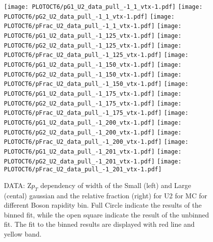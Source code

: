 \documentclass[41pt,a4paper,oneside]{report}
\begin{document}
\begin{figure}[h!]
  \begin{center}
    \texttt{[image: PLOTOCT6/pG1\_U2\_data\_pull\_-1\_1\_vtx-1.pdf]}
    \texttt{[image: PLOTOCT6/pG2\_U2\_data\_pull\_-1\_1\_vtx-1.pdf]}
    \texttt{[image: PLOTOCT6/pFrac\_U2\_data\_pull\_-1\_1\_vtx-1.pdf]} 
    \texttt{[image: PLOTOCT6/pG1\_U2\_data\_pull\_-1\_125\_vtx-1.pdf]}
    \texttt{[image: PLOTOCT6/pG2\_U2\_data\_pull\_-1\_125\_vtx-1.pdf]}
    \texttt{[image: PLOTOCT6/pFrac\_U2\_data\_pull\_-1\_125\_vtx-1.pdf]} 
    \texttt{[image: PLOTOCT6/pG1\_U2\_data\_pull\_-1\_150\_vtx-1.pdf]}
    \texttt{[image: PLOTOCT6/pG2\_U2\_data\_pull\_-1\_150\_vtx-1.pdf]}
    \texttt{[image: PLOTOCT6/pFrac\_U2\_data\_pull\_-1\_150\_vtx-1.pdf]} 
    \texttt{[image: PLOTOCT6/pG1\_U2\_data\_pull\_-1\_175\_vtx-1.pdf]}
    \texttt{[image: PLOTOCT6/pG2\_U2\_data\_pull\_-1\_175\_vtx-1.pdf]}
    \texttt{[image: PLOTOCT6/pFrac\_U2\_data\_pull\_-1\_175\_vtx-1.pdf]} 
    \texttt{[image: PLOTOCT6/pG1\_U2\_data\_pull\_-1\_200\_vtx-1.pdf]}
    \texttt{[image: PLOTOCT6/pG2\_U2\_data\_pull\_-1\_200\_vtx-1.pdf]}
    \texttt{[image: PLOTOCT6/pFrac\_U2\_data\_pull\_-1\_200\_vtx-1.pdf]} 
    \texttt{[image: PLOTOCT6/pG1\_U2\_data\_pull\_-1\_201\_vtx-1.pdf]}
    \texttt{[image: PLOTOCT6/pG2\_U2\_data\_pull\_-1\_201\_vtx-1.pdf]}
    \texttt{[image: PLOTOCT6/pFrac\_U2\_data\_pull\_-1\_201\_vtx-1.pdf]} 
    \caption{DATA: Z$p_{T}$ dependency of width of the Small (left) and Large (cental) gaussian and the relative fraction (right) for U2 for MC for different Boson rapidity bin. Full Circle indicate the results of the binned fit, while the open square indicate the result of the unbinned fit. The fit to the binned results are displayed with red line and yellow band. 
\newline
}
    \label{fig:SmallLargeU2DATA}
  \end{center}
\end{figure}
\end{document}
